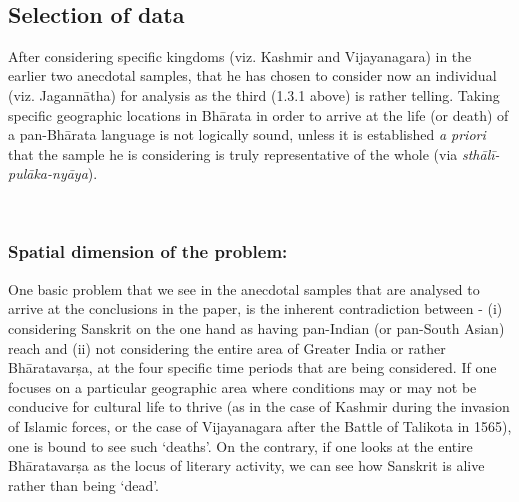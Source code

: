 ~\\[-20pt]

\subsection{Selection of data}

After considering specific kingdoms (viz. Kashmir and Vijayanagara) in the earlier two anecdotal samples, that he has chosen to consider now an individual   (viz. Jagannātha) for analysis as the third (1.3.1 above) is rather telling. Taking specific geographic locations in Bhārata in order to arrive at the life (or death) of a pan-Bhārata language is not logically sound, unless it is established {\sl a priori} that the sample he is considering is truly representative of the whole (via {\sl sthālī-pulāka-nyāya}). 

~\\[-40pt]

\subsubsection{Spatial dimension of the problem:}
\vskip -5pt

One basic problem that we see in the anecdotal samples that are analysed to arrive at the conclusions in the paper, is the inherent contradiction between - (i) considering Sanskrit on the one hand as having pan-Indian (or pan-South Asian) reach and (ii) not considering the entire area of Greater India or rather Bhāratavarṣa, at the four specific time periods that are being considered. If one focuses on a particular geographic area where conditions may or may not be conducive for cultural life to thrive (as in the case of Kashmir during the invasion of Islamic forces, or the case of Vijayanagara after the Battle of Talikota in 1565), one is bound to see such ‘deaths’. On the contrary, if one looks at the entire Bhāratavarṣa as the locus of literary activity, we can see how Sanskrit is alive rather than being ‘dead’. 

